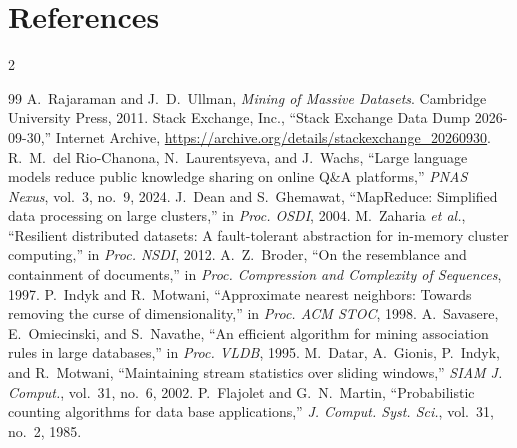 \documentclass[11pt,a4paper]{article}
\begin{document}
\section{References}
\vspace{-14pt}
\begin{multicols}{2}
{\footnotesize
\renewcommand{\section}[2]{}
\begin{thebibliography}{99}
\setlength{\itemsep}{0pt}
\setlength{\parskip}{0pt}
 A.~Rajaraman and J.~D.~Ullman, \emph{Mining of Massive Datasets}. Cambridge University Press, 2011.
 Stack Exchange, Inc., ``Stack Exchange Data Dump 2026-09-30,'' Internet Archive, \url{https://archive.org/details/stackexchange_20260930}.
 R.~M.~del Rio-Chanona, N.~Laurentsyeva, and J.~Wachs, ``Large language models reduce public knowledge sharing on online Q\&A platforms,'' \emph{PNAS Nexus}, vol.~3, no.~9, 2024.
 J.~Dean and S.~Ghemawat, ``MapReduce: Simplified data processing on large clusters,'' in \emph{Proc. OSDI}, 2004.
 M.~Zaharia \emph{et al.}, ``Resilient distributed datasets: A fault-tolerant abstraction for in-memory cluster computing,'' in \emph{Proc. NSDI}, 2012.
 A.~Z.~Broder, ``On the resemblance and containment of documents,'' in \emph{Proc. Compression and Complexity of Sequences}, 1997.
 P.~Indyk and R.~Motwani, ``Approximate nearest neighbors: Towards removing the curse of dimensionality,'' in \emph{Proc. ACM STOC}, 1998.
 A.~Savasere, E.~Omiecinski, and S.~Navathe, ``An efficient algorithm for mining association rules in large databases,'' in \emph{Proc. VLDB}, 1995.
 M.~Datar, A.~Gionis, P.~Indyk, and R.~Motwani, ``Maintaining stream statistics over sliding windows,'' \emph{SIAM J. Comput.}, vol.~31, no.~6, 2002.
 P.~Flajolet and G.~N.~Martin, ``Probabilistic counting algorithms for data base applications,'' \emph{J. Comput. Syst. Sci.}, vol.~31, no.~2, 1985.
\end{thebibliography}}
\end{multicols}
\end{document}

